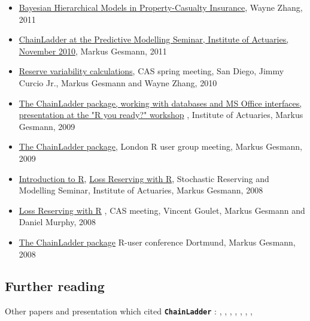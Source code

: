 \documentclass{article}
\newcommand{\chainladder}{\textbf{\texttt{ChainLadder}} }
\begin{document}
\begin{itemize}

\item 
  \href{http://www.actuaryzhang.com/seminar/seminar.html}{Bayesian
    Hierarchical Models in Property-Casualty Insurance}, Wayne Zhang, 2011

\item
  \href{http://chainladder.googlecode.com/files/ChainLadder_Markus_20010Nov10.pdf}{ChainLadder
    at the Predictive Modelling Seminar, Institute of Actuaries,
    November 2010}, Markus Gesmann, 2011

\item
  \href{http://chainladder.googlecode.com/files/CAS-Spring-Meeting-2010-C21.pdf}{Reserve
    variability calculations},  CAS spring meeting, San Diego,
   Jimmy Curcio Jr., Markus Gesmann and Wayne Zhang,  2010

\item
  \href{http://chainladder.googlecode.com/files/ChainLadder_Markus_20090724.pdf}{The
    ChainLadder package, working with databases and MS Office
    interfaces, presentation at the "R you ready?" workshop} , Institute
  of Actuaries, Markus Gesmann, 2009
  
\item
  \href{http://chainladder.googlecode.com/files/ChainLadder_at_London_R_User_Group_20090331.pdf}
  {The ChainLadder package}, London R user group meeting, Markus
  Gesmann, 2009 

\item 
  \href{http://chainladder.googlecode.com/files/Introduction_to_R_20081203.pdf}{Introduction
    to R},
  \href{http://chainladder.googlecode.com/files/Loss_Reserving_in_R_20081203.pdf}{Loss
    Reserving with R},  Stochastic Reserving and Modelling Seminar, Institute of Actuaries,
  Markus Gesmann, 2008
  
\item
  \href{http://chainladder.googlecode.com/files/LossReserving%20with%20R%2020081113.pdf}{Loss
    Reserving with R} , CAS meeting, Vincent Goulet, Markus Gesmann and Daniel Murphy, 2008 
    
\item 
  \href{http://chainladder.googlecode.com/files/ChainLadderPackage_Dortmund_2008.pdf}{The
    ChainLadder package} R-user conference Dortmund, Markus Gesmann,
  2008
\end{itemize}

\subsection{Further reading}
Other papers and presentation which cited \chainladder:
\cite{Orr2007}, \cite{Nichols2009}, \cite{Zhang2010a},
\cite{MariaDoloresMartinezMiranda2010}, \cite{Schirmacher2010},
\cite{MariaDoloresMartinezMiranda2011}, \cite{Escoto2011},
\cite{Spedicato2011} 
\end{document}
